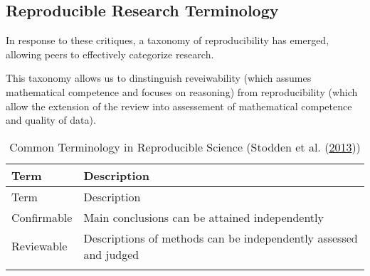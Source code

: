 \documentclass[11pt,preprint, authoryear]{elsarticle}
\numberwithin{equation}{section}
\numberwithin{figure}{section}
\numberwithin{table}{section}
\begin{document}
\subsection{Reproducible Research
Terminology}\label{reproducible-research-terminology}

In response to these critiques, a taxonomy of reproducibility has
emerged, allowing peers to effectively categorize research.

This taxonomy allows us to dinstinguish reveiwability (which assumes
mathematical competence and focuses on reasoning) from reproducibility
(which allow the extension of the review into assessement of
mathematical competence and quality of data).

\begin{longtable}[]{@{}ll@{}}
\caption{Common Terminology in Reproducible Science (Stodden et al.
(\protect\hyperlink{ref-Stodden2013}{2013}))\label{Table1}}\tabularnewline
\toprule
\begin{minipage}[b]{0.18\columnwidth}\raggedright\strut
Term\strut
\end{minipage} & \begin{minipage}[b]{0.61\columnwidth}\raggedright\strut
Description\strut
\end{minipage}\tabularnewline
\midrule
\endfirsthead
\toprule
\begin{minipage}[b]{0.18\columnwidth}\raggedright\strut
Term\strut
\end{minipage} & \begin{minipage}[b]{0.61\columnwidth}\raggedright\strut
Description\strut
\end{minipage}\tabularnewline
\midrule
\endhead
\begin{minipage}[t]{0.18\columnwidth}\raggedright\strut
Confirmable\strut
\end{minipage} & \begin{minipage}[t]{0.61\columnwidth}\raggedright\strut
Main conclusions can be attained independently\strut
\end{minipage}\tabularnewline
\begin{minipage}[t]{0.18\columnwidth}\raggedright\strut
Reviewable\strut
\end{minipage} & \begin{minipage}[t]{0.61\columnwidth}\raggedright\strut
Descriptions of methods can be independently assessed and judged\strut
\end{minipage}\tabularnewline
\begin{minipage}[t]{0.18\columnwidth}\raggedright\strut

\end{minipage}
\end{longtable}
\end{document}
